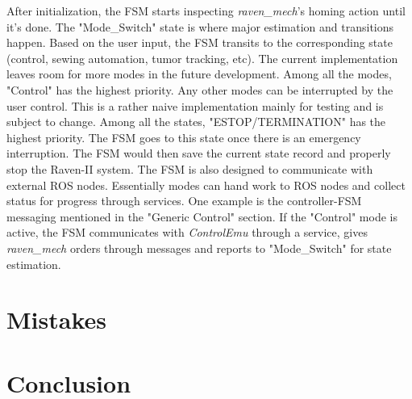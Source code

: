\documentclass[letterpaper,twocolumn,10pt]{article}
\begin{document}
After initialization, the FSM starts inspecting {\it raven\_mech}'s
homing action until it's done. The "Mode\_Switch" state is where major
estimation and transitions happen. Based on the user input, the FSM
transits to the corresponding state (control, sewing automation, tumor
tracking, etc). The current implementation leaves room for more modes
in the future development. Among all the modes, "Control" has the
highest priority. Any other modes can be interrupted by the user
control. This is a rather naive implementation mainly for testing and
is subject to change. Among all the states, "ESTOP/TERMINATION" has
the highest priority. The FSM goes to this state once there is an
emergency interruption. The FSM would then save the current state
record and properly stop the Raven-II system. The FSM is also designed
to communicate with external ROS nodes. Essentially modes can hand
work to ROS nodes and collect status for progress through
services. One example is the controller-FSM messaging mentioned in the
"Generic Control" section. If the "Control" mode is active, the FSM
communicates with {\it ControlEmu} through a service, gives {\it
  raven\_mech} orders through messages and reports to "Mode\_Switch"
for state estimation.

\section{Mistakes}

\section{Conclusion}



\end{document}
